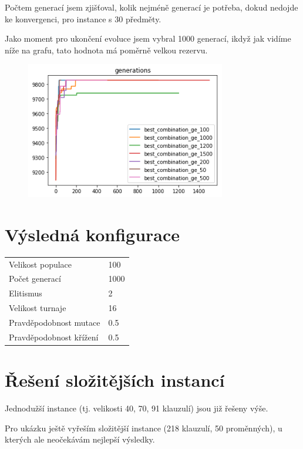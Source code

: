 \documentclass[a4paper,10pt,twocolumn]{article}
\begin{document}
\begin{itemize}
\begin{itemize}
Počtem generací jsem zjišťoval, kolik nejméně generací je potřeba, dokud nedojde ke konvergenci, pro instance s 30 předměty.

Jako moment pro ukončení evoluce jsem vybral 1000 generací, ikdyž jak vidíme níže na grafu, tato hodnota má poměrně velkou rezervu.


\begin{figure}[H]
  \begin{center}
    \includegraphics[height=6cm]{graphs/generations.png}
  \end{center}
\end{figure}


\section{Výsledná konfigurace}

\begin{tabular}{l|l}
Velikost populace       & 100  \\
Počet generací          & 1000 \\
Elitismus               & 2    \\
Velikost turnaje        & 16   \\
Pravděpodobnost mutace  & 0.5  \\
Pravděpodobnost křížení & 0.5 
\end{tabular}

\section{Řešení složitějších instancí}

Jednodužší instance (tj. velikosti 40, 70, 91 klauzulí) jsou již řešeny výše.

Pro ukázku ještě vyřeším složitější instance (218 klauzulí, 50 proměnných), u kterých ale neočekávám nejlepší výsledky.



\end{itemize}
\end{itemize}
\end{document}
